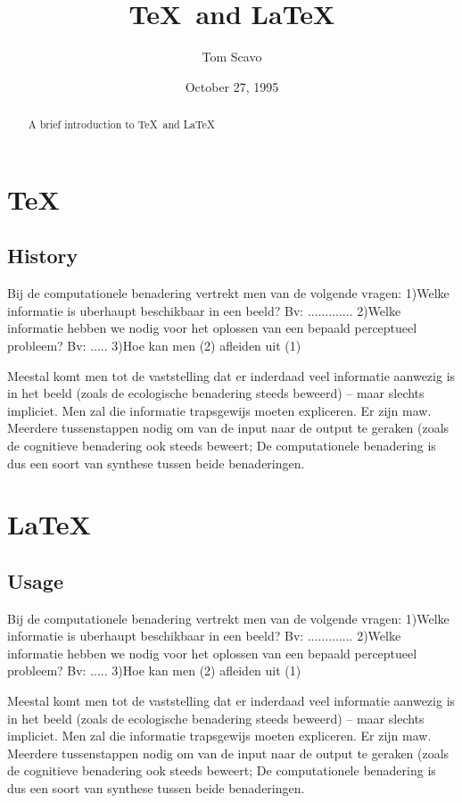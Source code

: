 \documentclass[]{article}  %
\begin{document}
\title{\TeX\ and \LaTeX}   %
\author{Tom Scavo}         %
\date{October 27, 1995}    %
\maketitle

\begin{abstract}
  A brief introduction to \TeX\ and \LaTeX
\end{abstract}

\section{\TeX}             %
\subsection{History}       %

Bij de computationele benadering vertrekt men van de volgende vragen:
1)Welke informatie is uberhaupt beschikbaar in een beeld?
Bv: .............
2)Welke informatie hebben we nodig voor het oplossen van een bepaald perceptueel probleem?
Bv: .....
3)Hoe kan men (2) afleiden uit (1)

Meestal komt men tot de vaststelling dat er inderdaad veel informatie aanwezig is in het beeld (zoals de ecologische benadering steeds beweerd) – maar slechts impliciet. Men zal die informatie trapsgewijs moeten expliceren. Er zijn maw. Meerdere tussenstappen nodig om van de input naar de output te geraken (zoals de cognitieve benadering ook steeds beweert; De computationele benadering is dus een soort van synthese tussen beide benaderingen. 


\section{\LaTeX}           %
\subsection{Usage}         %

Bij de computationele benadering vertrekt men van de volgende vragen:
1)Welke informatie is uberhaupt beschikbaar in een beeld?
Bv: .............
2)Welke informatie hebben we nodig voor het oplossen van een bepaald perceptueel probleem?
Bv: .....
3)Hoe kan men (2) afleiden uit (1)

Meestal komt men tot de vaststelling dat er inderdaad veel informatie aanwezig is in het beeld (zoals de ecologische benadering steeds beweerd) – maar slechts impliciet. Men zal die informatie trapsgewijs moeten expliceren. Er zijn maw. Meerdere tussenstappen nodig om van de input naar de output te geraken (zoals de cognitieve benadering ook steeds beweert; De computationele benadering is dus een soort van synthese tussen beide benaderingen. 


\begin{thebibliography}{9}
\end{thebibliography}
\end{document}
